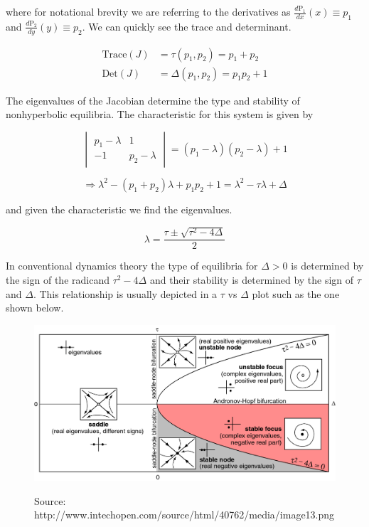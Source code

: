 \documentclass{article}
\begin{document}
\noindent where for notational brevity we are referring to the derivatives as
$\frac{d\text{P}_1}{dx}(x) \equiv p_1$ and $\frac{d\text{P}_2}{dy}(y) \equiv p_2$.
We can quickly see the trace and determinant.

\begin{align}
    \text{Trace}(J) &= \tau(p_1,p_2) = p_1 + p_2 \label{eq:trace} \\ 
    \text{Det}(J) &= \Delta(p_1,p_2) = p_1 p_2 +1 \label{eq:det}
\end{align}

\noindent The eigenvalues of the Jacobian determine the type and stability of
nonhyperbolic equilibria. The characteristic for this system is given by

\begin{equation*}
    \begin{vmatrix}
        p_1-\lambda & 1 \\
        -1 & p_2-\lambda
    \end{vmatrix} = (p_1-\lambda)(p_2-\lambda)+1 
\end{equation*}

\begin{equation}
    \Rightarrow \lambda^2 - (p_1+p_2)\lambda + p_1 p_2 +1 = \lambda^2 - \tau
    \lambda + \Delta \label{eq:characteristic}
\end{equation}

\noindent and given the characteristic we find the eigenvalues.

\[\lambda = \frac{\tau \pm \sqrt{\tau^2-4\Delta}}{2}\]

\noindent In conventional dynamics theory the type of equilibria for $\Delta>0$ is determined by
the sign of the radicand $\tau^2-4\Delta$ and their stability is
determined by the sign of $\tau$ and $\Delta$. This relationship is usually
depicted in a $\tau$ vs $\Delta$ plot such as the one shown below.

\begin{figure}[h]
\centering
\includegraphics[scale=0.37]{tauvsdelta.png} \\
\caption{Source: http://www.intechopen.com/source/html/40762/media/image13.png}
\end{figure}
\end{document}
